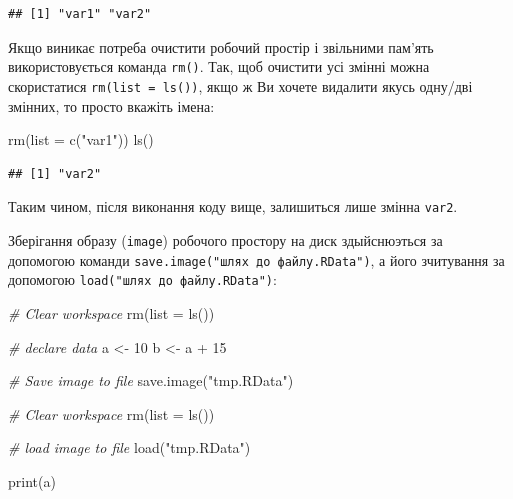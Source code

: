 \documentclass[
]{book}
\newenvironment{Shaded}{\begin{snugshade}}{\end{snugshade}}
\newcommand{\AttributeTok}[1]{\textcolor[rgb]{0.77,0.63,0.00}{#1}}
\newcommand{\CommentTok}[1]{\textcolor[rgb]{0.56,0.35,0.01}{\textit{#1}}}
\newcommand{\DecValTok}[1]{\textcolor[rgb]{0.00,0.00,0.81}{#1}}
\newcommand{\FunctionTok}[1]{\textcolor[rgb]{0.00,0.00,0.00}{#1}}
\newcommand{\NormalTok}[1]{#1}
\newcommand{\OtherTok}[1]{\textcolor[rgb]{0.56,0.35,0.01}{#1}}
\newcommand{\SpecialCharTok}[1]{\textcolor[rgb]{0.00,0.00,0.00}{#1}}
\newcommand{\StringTok}[1]{\textcolor[rgb]{0.31,0.60,0.02}{#1}}
\begin{document}
\begin{verbatim}
## [1] "var1" "var2"
\end{verbatim}

Якщо виникає потреба очистити робочий простір і звільними пам'ять використовується команда \texttt{rm()}. Так, щоб очистити усі змінні можна скористатися \texttt{rm(list\ =\ ls())}, якщо ж Ви хочете видалити якусь одну/дві змінних, то просто вкажіть імена:

\begin{Shaded}
\begin{Highlighting}[]
\FunctionTok{rm}\NormalTok{(}\AttributeTok{list =} \FunctionTok{c}\NormalTok{(}\StringTok{"var1"}\NormalTok{))}
\FunctionTok{ls}\NormalTok{()}
\end{Highlighting}
\end{Shaded}

\begin{verbatim}
## [1] "var2"
\end{verbatim}

Таким чином, після виконання коду вище, залишиться лише змінна \texttt{var2}.

Зберігання образу (\texttt{image}) робочого простору на диск здыйснюэться за допомогою команди \texttt{save.image("шлях\ до\ файлу.RData")}, а його зчитування за допомогою \texttt{load("шлях\ до\ файлу.RData")}:

\begin{Shaded}
\begin{Highlighting}[]
\CommentTok{\# Clear workspace}
\FunctionTok{rm}\NormalTok{(}\AttributeTok{list =} \FunctionTok{ls}\NormalTok{())}

\CommentTok{\# declare data}
\NormalTok{a }\OtherTok{\textless{}{-}} \DecValTok{10}
\NormalTok{b }\OtherTok{\textless{}{-}}\NormalTok{ a }\SpecialCharTok{+} \DecValTok{15}

\CommentTok{\# Save image to file}
\FunctionTok{save.image}\NormalTok{(}\StringTok{"tmp.RData"}\NormalTok{)}
\end{Highlighting}
\end{Shaded}

\begin{Shaded}
\begin{Highlighting}[]
\CommentTok{\# Clear workspace}
\FunctionTok{rm}\NormalTok{(}\AttributeTok{list =} \FunctionTok{ls}\NormalTok{())}

\CommentTok{\# load image to file}
\FunctionTok{load}\NormalTok{(}\StringTok{"tmp.RData"}\NormalTok{)}

\FunctionTok{print}\NormalTok{(a)}
\end{Highlighting}
\end{Shaded}
\end{document}
